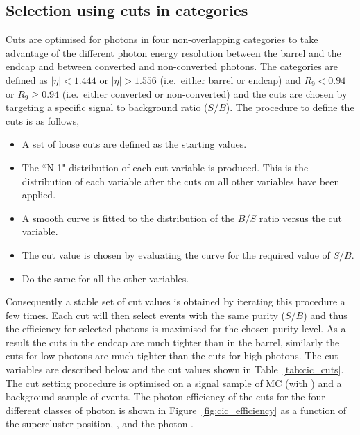 \subsection{Selection using cuts in categories}
\label{sec:cic}

Cuts are optimised for photons in four non-overlapping categories to take advantage of the different photon energy resolution between the barrel and the endcap and between converted and non-converted photons. The categories are defined as $|\eta|<1.444$ or $|\eta|>1.556$ (i.e.\ either barrel or endcap) and $R_{9}<0.94$ or $R_{9}\geq 0.94$ (i.e.\ either converted or non-converted) and the cuts are chosen by targeting a specific signal to background ratio ($S/B$). The procedure to define the cuts is as follows,

\begin{itemize}
  \item A set of loose cuts are defined as the starting values.
  \item The ``N-1" distribution of each cut variable is produced. This is the distribution of each variable after the cuts on all other variables have been applied.
  \item A smooth curve is fitted to the distribution of the $B/S$ ratio versus the cut variable.
  \item The cut value is chosen by evaluating the curve for the required value of $S/B$.
  \item Do the same for all the other variables.
\end{itemize}

Consequently a stable set of cut values is obtained by iterating this procedure a few times. Each cut will then select events with the same purity ($S/B$) and thus the efficiency for selected photons is maximised for the chosen purity level. As a result the cuts in the endcap are much tighter than in the barrel, similarly the cuts for low \rnine photons are much tighter than the cuts for high \rnine photons. The cut variables are described below and the cut values shown in Table~\ref{tab:cic_cuts}. The cut setting procedure is optimised on a signal sample of \Hgg MC (with \GeV) and a background sample of \gjet events. The photon efficiency of the cuts for the four different classes of photon is shown in Figure~\ref{fig:cic_efficiency} as a function of the supercluster position, \eta, and the photon \pT.

